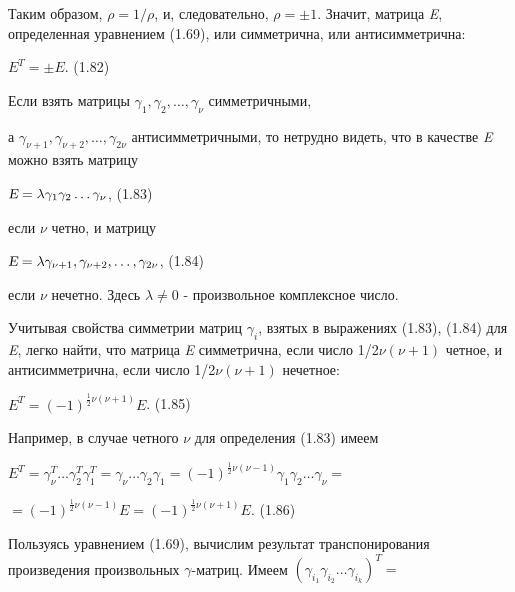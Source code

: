 \documentclass{article}
\begin{document}
{\begin{center}
\end{center}
Таким образом, $\rho=1/\rho$, и, следовательно, $\rho=\pm1$. Значит, матрица \textsl{E}, определенная уравнением (1.69), или симметрична, или антисимметрична:\par
\begin{center}
$E^{T}=\pm E.$        (1.82)\par
\end{center}
Если взять матрицы $\gamma_1, \gamma_2, \dots ,\gamma_{\nu}$ симметричными,\par
а $\gamma_{\nu+1},\gamma_{\nu+2},\dots,\gamma_{2\nu}$ антисимметричными, то нетрудно видеть, что в качестве \textsl{E} можно взять матрицу\par
\begin{center}
$\textsl{E}=\lambda\gamma_1\gamma_2 \dots \gamma_{\nu}$,      (1.83)\par
\end{center}
если $\nu$ четно, и матрицу\par
\begin{center}
$\textsl{E}=\lambda\gamma_{\nu+1},\gamma_{\nu+2}, \dots, \gamma_{2\nu}$,     (1.84)\par
\end{center}
если $\nu$ нечетно. Здесь $\lambda\ne0$ - произвольное комплексное число.\par
Учитывая свойства симметрии матриц $\gamma_i$, взятых в выражениях (1.83), (1.84) для \textsl{E}, легко найти, что матрица \textsl{E} симметрична, если число 1/2$\nu(\nu+1)$ четное, и антисимметрична, если число 1/2$\nu(\nu+1)$ нечетное:\par
\begin{center}
$E^T=(-1)^{\frac{1}{2}\nu(\nu+1)}E$. (1.85)\par
\end{center}
Например, в случае четного $\nu$ для определения (1.83) имеем\par
$E^T=\gamma^{T}_{\nu}\dots \gamma^{T}_2\gamma^{T}_1=\gamma_{\nu}\dots \gamma_2\gamma_1=(-1)^{\frac{1}{2}\nu(\nu-1)}\gamma_1\gamma_2\dots \gamma_{\nu}=$\par
\begin{center}
$=(-1)^{\frac{1}{2}\nu(\nu-1)}E=(-1)^{\frac{1}{2}\nu(\nu+1)}E.$     (1.86) \par
\end{center}
Пользуясь уравнением (1.69), вычислим результат транспонирования произведения произвольных $\gamma$-матриц. Имеем $(\gamma_{i_1}\gamma_{i_2} \dots \gamma_{i_k})^{T}=$\par
}
\end{document}
